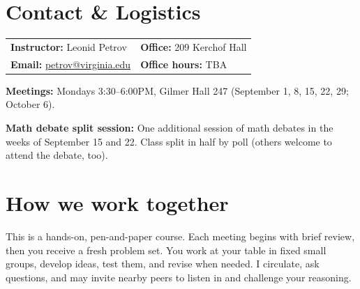 \documentclass[oneside,11pt]{amsart}
\begin{document}
\newpage
\section{Contact \& Logistics}

\noindent
\begin{tabular}{ll}
\textbf{Instructor:} Leonid Petrov &\qquad \qquad \qquad\textbf{Office:} 209 Kerchof Hall \\
\textbf{Email:} \href{mailto:petrov@virginia.edu}{petrov@virginia.edu} & \qquad \qquad \qquad\textbf{Office hours:} TBA \\
\end{tabular}

\vspace{4pt}

\noindent\textbf{Meetings:} 
Mondays 3:30--6:00PM, Gilmer Hall 247
(September 1, 8, 15, 22, 29; October 6).

\medskip
\noindent
\textbf{Math debate split session:} One additional session of math debates in the weeks of September 15 and 22. 
Class split in half by poll (others welcome to attend the debate, too).

\section{How we work together}

This is a hands-on, pen-and-paper course. Each meeting begins with 
brief review, then you receive
a fresh problem set. You work at your table in fixed small groups, develop ideas, test them, and revise when needed. I circulate, ask questions, and may invite nearby peers to listen in and challenge your reasoning.
\end{document}
